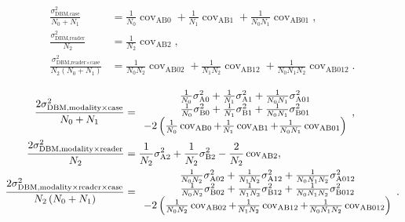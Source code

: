 \documentclass{article}%
\begin{document}
\begin{align}
\frac{\sigma_{\text{DBM,case}}^{2}}{N_{0}+N_{1}}  &  =\frac{1}{N_{0}%
}\operatorname{cov}_{\text{AB}0}+\frac{1}{N_{1}}\operatorname{cov}%
_{\text{AB}1}+\frac{1}{N_{0}N_{1}}\operatorname{cov}_{\text{AB}01},\\
\frac{\sigma_{\text{DBM,reader}}^{2}}{N_{2}}  &  =\frac{1}{N_{2}%
}\operatorname{cov}_{\text{AB}2},\\
\frac{\sigma_{\text{DBM,reader}\times\text{case}}^{2}}{N_{2}\left(
N_{0}+N_{1}\right)  }  &  =\frac{1}{N_{0}N_{2}}\operatorname{cov}%
_{\text{AB}02}+\frac{1}{N_{1}N_{2}}\operatorname{cov}_{\text{AB}12}+\frac
{1}{N_{0}N_{1}N_{2}}\operatorname{cov}_{\text{AB}012}.
\end{align}
%

\begin{align}
\frac{2\sigma_{\text{DBM,modality}\times\text{case}}^{2}}{N_{0}+N_{1}}  &  =%
\begin{array}
[c]{c}%
\frac{1}{N_{0}}\sigma_{\text{A}0}^{2}+\frac{1}{N_{1}}\sigma_{\text{A}1}%
^{2}+\frac{1}{N_{0}N_{1}}\sigma_{\text{A}01}^{2}\\
\frac{1}{N_{0}}\sigma_{\text{B}0}^{2}+\frac{1}{N_{1}}\sigma_{\text{B}1}%
^{2}+\frac{1}{N_{0}N_{1}}\sigma_{\text{B}01}^{2}\\
-2\left(  \frac{1}{N_{0}}\operatorname{cov}_{\text{AB}0}+\frac{1}{N_{1}%
}\operatorname{cov}_{\text{AB}1}+\frac{1}{N_{0}N_{1}}\operatorname{cov}%
_{\text{AB}01}\right)
\end{array}
,\\
\frac{2\sigma_{\text{DBM,modality}\times\text{reader}}^{2}}{N_{2}}  &
=\frac{1}{N_{2}}\sigma_{\text{A}2}^{2}+\frac{1}{N_{2}}\sigma_{\text{B}2}%
^{2}-\frac{2}{N_{2}}\operatorname{cov}_{\text{AB}2},\\
\frac{2\sigma_{\text{DBM,modality}\times\text{reader}\times\text{case}}^{2}%
}{N_{2}\left(  N_{0}+N_{1}\right)  }  &  =%
\begin{array}
[c]{c}%
\frac{1}{N_{0}N_{2}}\sigma_{\text{A}02}^{2}+\frac{1}{N_{1}N_{2}}%
\sigma_{\text{A}12}^{2}+\frac{1}{N_{0}N_{1}N_{2}}\sigma_{\text{A}012}^{2}\\
\frac{1}{N_{0}N_{2}}\sigma_{\text{B}02}^{2}+\frac{1}{N_{1}N_{2}}%
\sigma_{\text{B}12}^{2}+\frac{1}{N_{0}N_{1}N_{2}}\sigma_{\text{B}012}^{2}\\
-2\left(  \frac{1}{N_{0}N_{2}}\operatorname{cov}_{\text{AB}02}+\frac{1}%
{N_{1}N_{2}}\operatorname{cov}_{\text{AB}12}+\frac{1}{N_{0}N_{1}N_{2}%
}\operatorname{cov}_{\text{AB}012}\right)
\end{array}
.
\end{align}
\end{document}
